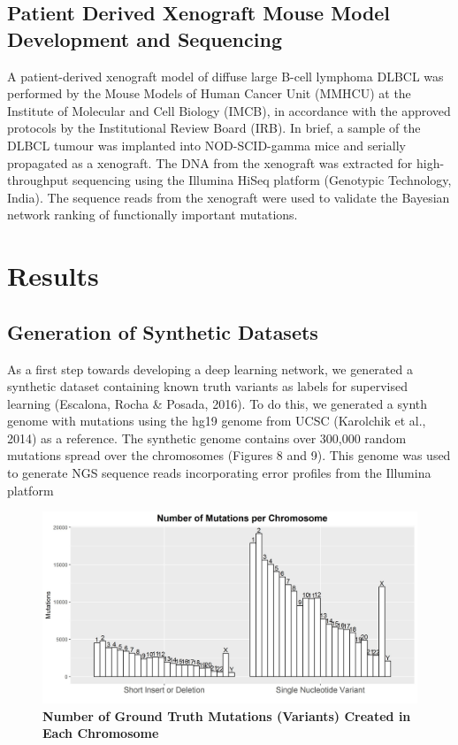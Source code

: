 \documentclass{article}
\begin{document}
\subsection{Patient Derived Xenograft Mouse Model Development and Sequencing}
A patient-derived xenograft model of diffuse large B-cell lymphoma DLBCL was performed by the Mouse Models of Human Cancer Unit (MMHCU) at the Institute of Molecular and Cell Biology (IMCB), in accordance with the approved protocols by the Institutional Review Board (IRB). In brief, a sample of the DLBCL tumour was implanted into NOD-SCID-gamma mice and serially propagated as a xenograft. The DNA from the xenograft was extracted for high-throughput sequencing using the Illumina HiSeq platform (Genotypic Technology, India). The sequence reads from the xenograft were used to validate the Bayesian network ranking of functionally important mutations. 
\newpage
\section{Results}
\subsection{Generation of Synthetic Datasets}
As a first step towards developing a deep learning network, we generated a synthetic dataset containing known truth variants as labels for supervised learning (Escalona, Rocha \& Posada, 2016). To do this, we generated a synth genome with mutations using the hg19 genome from UCSC (Karolchik et al., 2014) as a reference. The synthetic genome contains over 300,000 random mutations spread over the chromosomes (Figures 8 and 9). This genome was used to generate NGS sequence reads incorporating error profiles from the Illumina platform

\begin{figure}[H]
\centering
\includegraphics[width=\textwidth]{MutationInSimulatedGenome.jpg}
\caption{\textbf{Number of Ground Truth Mutations (Variants) Created in Each Chromosome}}
\end{figure}
\end{document}
